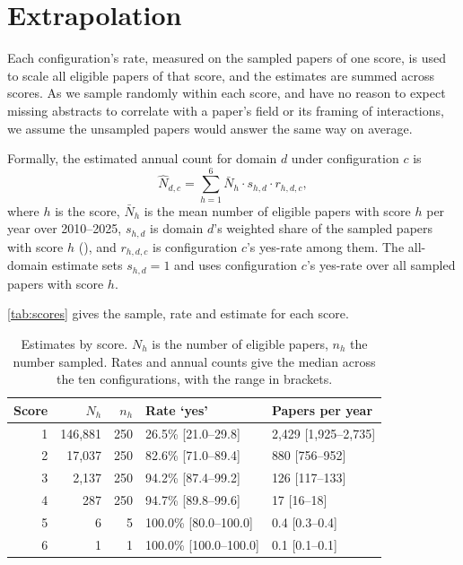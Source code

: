 \documentclass[openacc]{rstb}
\begin{document}
\section{Extrapolation}
Each configuration's rate, measured on the sampled papers of one score, is used to scale all eligible papers of that score, and the estimates are summed across scores.
As we sample randomly within each score, and have no reason to expect missing abstracts to correlate with a paper's field or its framing of interactions, we assume the unsampled papers would answer the same way on average.

Formally, the estimated annual count for domain $d$ under configuration $c$ is
\begin{equation}
  \hat{N}_{d,c} = \sum_{h=1}^{6} \bar{N}_h \cdot s_{h,d} \cdot r_{h,d,c},
  \label{eq:extrapolation}
\end{equation}
where $h$ is the score, $\bar{N}_h$ is the mean number of eligible papers with score $h$ per year over 2010--2025, $s_{h,d}$ is domain $d$'s weighted share of the sampled papers with score $h$ (), and $r_{h,d,c}$ is configuration $c$'s yes-rate among them.
The all-domain estimate sets $s_{h,d} = 1$ and uses configuration $c$'s yes-rate over all sampled papers with score $h$.

\autoref{tab:scores} gives the sample, rate and estimate for each score.

\begin{table}[h]
  \centering\small
  \caption{Estimates by score. $N_h$ is the number of eligible papers, $n_h$ the number sampled.
  Rates and annual counts give the median across the ten configurations, with the range in brackets.}
  \label{tab:scores}
  \begin{tabular}{rrrll}
    \hline
    Score & $N_h$ & $n_h$ & Rate `yes' & Papers per year \\
    \hline
    1 & 146{,}881 & 250 & 26.5\% [21.0--29.8]  & 2{,}429 [1{,}925--2{,}735] \\
    2 & 17{,}037  & 250 & 82.6\% [71.0--89.4]  & 880 [756--952] \\
    3 & 2{,}137   & 250 & 94.2\% [87.4--99.2]  & 126 [117--133] \\
    4 & 287       & 250 & 94.7\% [89.8--99.6]  & 17 [16--18] \\
    5 & 6         & 5   & 100.0\% [80.0--100.0] & 0.4 [0.3--0.4] \\
    6 & 1         & 1   & 100.0\% [100.0--100.0] & 0.1 [0.1--0.1] \\
    \hline
  \end{tabular}
\end{table}
\end{document}
